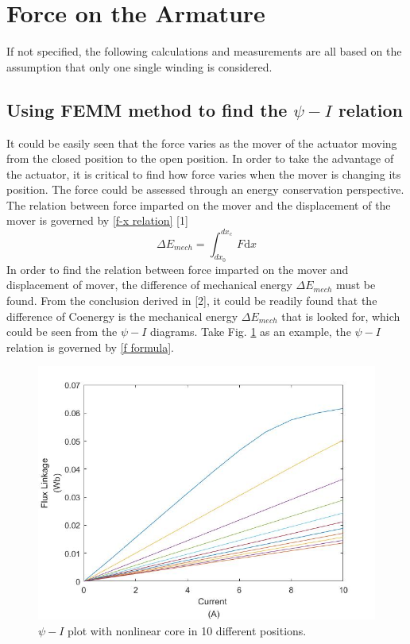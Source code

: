 \documentclass[a4paper]{IEEEtran}
\begin{document}
{\section{Force on the Armature}
If not specified, the following calculations and measurements are all based on the assumption that only one single winding is considered.
\subsection{Using FEMM method to find the $\psi-I$ relation}
It could be easily seen that the force varies as the mover of the
actuator moving from the closed position to the open position. In order 
to take the advantage of the actuator, it is critical to find how force varies when
the mover is changing its position. The force could be assessed through an 
energy conservation perspective. The relation between force imparted on the mover
and the displacement of the mover is governed by \eqref{f-x relation} [1]
\begin{equation}
  \Delta E_{mech}=\int_{dx_0}^{dx_c}  \,F\mathrm{d}x \label{f-x relation}
\end{equation}
In order to find the relation between force imparted on the mover and displacement of mover,
the difference of mechanical energy $\Delta E_{mech}$ must be found.
From the conclusion derived in [2], it could be readily found that the difference of Coenergy is the 
mechanical energy $\Delta E_{mech}$ that is looked for, which could be seen from the
$\psi-I$ diagrams. Take Fig. {\ref{psi-i_nonlinear}} as an example, the $\psi-I$ relation is governed by
\eqref{f formula}.

\begin{figure}[H]
\begin{centering}
\includegraphics[scale=0.3]{psi-i_nonlinear.jpg}
\par\end{centering}   
\caption{$\psi-I$ plot with nonlinear core in 10 different positions.\label{psi-i_nonlinear}}
\end{figure}  

}
\end{document}
